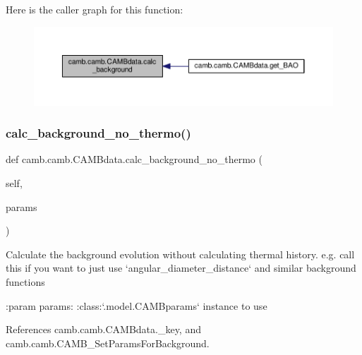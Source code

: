 Here is the caller graph for this function\+:
\nopagebreak
\begin{figure}[H]
\begin{center}
\leavevmode
\includegraphics[width=350pt]{classcamb_1_1camb_1_1CAMBdata_a93e9fcebd9c7adb98d59d3ace6cd94c7_icgraph}
\end{center}
\end{figure}
\mbox{\label{classcamb_1_1camb_1_1CAMBdata_a5747c0c9bc806c82305597d3ed7b0099}} 
\subsubsection{\texorpdfstring{calc\+\_\+background\+\_\+no\+\_\+thermo()}{calc\_background\_no\_thermo()}}
{\footnotesize\ttfamily def camb.\+camb.\+C\+A\+M\+Bdata.\+calc\+\_\+background\+\_\+no\+\_\+thermo (\begin{DoxyParamCaption}\item[{}]{self,  }\item[{}]{params }\end{DoxyParamCaption})}

\begin{DoxyVerb}Calculate the background evolution without calculating thermal history.
e.g. call this if you want to just use `angular_diameter_distance` and similar background functions

:param params:  :class:`.model.CAMBparams` instance to use
\end{DoxyVerb}
 

References camb.\+camb.\+C\+A\+M\+Bdata.\+\_\+key, and camb.\+camb.\+C\+A\+M\+B\+\_\+\+Set\+Params\+For\+Background.

\mbox{\label{classcamb_1_1camb_1_1CAMBdata_a5bed120089296027889dc5fc40a91f10}} 
